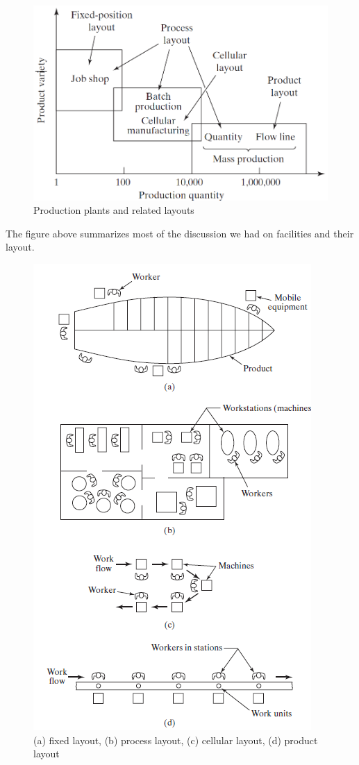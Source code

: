 \begin{figure}[h]
    \centering
    \includegraphics[scale=0.5]{img/layouts_plants.png}
    \caption{Production plants and related layouts}
\end{figure}

The figure above summarizes most of the discussion we had on facilities and their layout.

\begin{figure}
    \centering
    \includegraphics[scale=1.2]{img/plant_layouts.png}
    \caption{(a) fixed layout, (b) process layout, (c) cellular layout, (d) product layout}
\end{figure}

